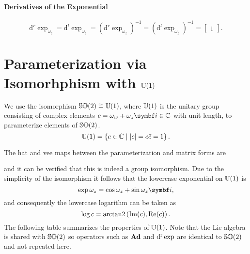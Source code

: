 \begin{properties}[breakable, title={$\SOtwo$ formula sheet}]
  \paragraph{Derivatives of the Exponential}
  \begin{equation}
    \mathrm{d}^r \exp_{\omega_z} =
    \mathrm{d}^l \exp_{\omega_z} =
    \left( \mathrm{d}^r \exp_{\omega_z} \right)^{-1} =
    \left( \mathrm{d}^l \exp_{\omega_z} \right)^{-1} = \begin{bmatrix} 1 \end{bmatrix}.
  \end{equation}
\end{properties}

\section{Parameterization via Isomorhphism with \texorpdfstring{${\mathbb{U}(1)}$}{U(1)}}

We use the isomorphism ${\mathbb{SO}(2)} \cong {\mathbb{U}(1)}$, where ${\mathbb{U}(1)}$ is the unitary group consisting of complex elements $c = \omega_w + \omega_z \bi \in \mathbb{C}$ with unit length, to parameterize elements of $\SOtwo$.
\begin{equation}
  {\mathbb{U}(1)} = \left\{ c \in \mathbb{C} \mid | c | = c \bar c = 1 \right\}.
\end{equation}

The hat and vee maps between the parameterization and matrix forms are
\begin{center}
\end{center}
and it can be verified that this is indeed a group isomorphism. Due to the simplicity of the isomorphism it follows that the lowercase exponential on ${\mathbb{U}(1)}$ is
\begin{equation}
  \exp \omega_z = \cos \omega_z + \sin \omega_z \bi,
\end{equation}
and consequently the lowercase logarithm can be taken as
\begin{equation}
  \log c = \operatorname{arctan2}\left(\textrm{Im}(c), \textrm{Re}(c)\right).
\end{equation}
The following table summarizes the properties of ${\mathbb{U}(1)}$. Note that the Lie algebra is shared with $\SOtwo$ so operators such as $\operatorname{\textbf{Ad}}$ and $\operatorname{d^r} \exp$ are identical to $\SOtwo$ and not repeated here.

